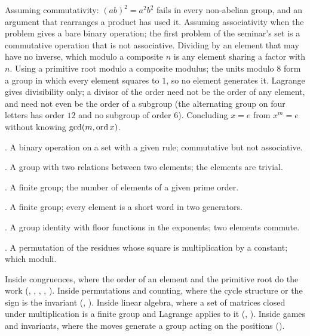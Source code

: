 \begin{trap}
Assuming commutativity: $(ab)^2=a^2b^2$ fails in every non-abelian group, and an argument that rearranges a product has used it. Assuming associativity when the problem gives a bare binary operation; the first problem of the seminar's set is a commutative operation that is not associative. Dividing by an element that may have no inverse, which modulo a composite $n$ is any element sharing a factor with $n$. Using a primitive root modulo a composite modulus; the units modulo $8$ form a group in which every element squares to $1$, so no element generates it. Lagrange gives divisibility only; a divisor of the order need not be the order of any element, and need not even be the order of a subgroup (the alternating group on four letters has order $12$ and no subgroup of order $6$). Concluding $x=e$ from $x^m=e$ without knowing $\gcd(m,\operatorname{ord} x)$.
\end{trap}

\begin{ladder}
\item {}. A binary operation on a set with a given rule; commutative but not associative.
\item {}. A group with two relations between two elements; the elements are trivial.
\item {}. A finite group; the number of elements of a given prime order.
\item {}. A finite group; every element is a short word in two generators.
\item {}. A group identity with floor functions in the exponents; two elements commute.
\item {}. A permutation of the residues whose square is multiplication by a constant; which moduli.
\end{ladder}

\begin{hides}
Inside congruences, where the order of an element and the primitive root do the work (, , , , ). Inside permutations and counting, where the cycle structure or the sign is the invariant (, ). Inside linear algebra, where a set of matrices closed under multiplication is a finite group and Lagrange applies to it (, ). Inside games and invariants, where the moves generate a group acting on the positions ().
\end{hides}
